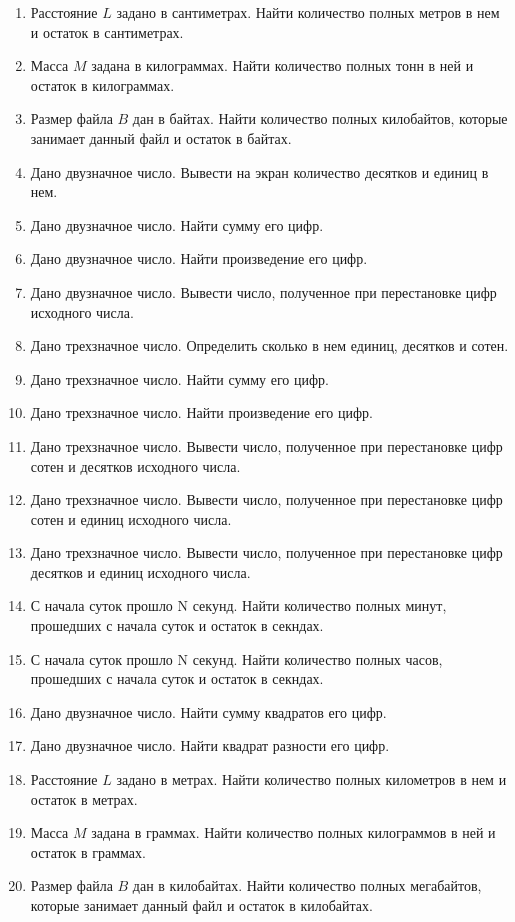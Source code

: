 \begin{enumerate}
\item Расстояние $L$ задано в сантиметрах. Найти количество полных метров в нем и остаток в
сантиметрах.
\item Масса $M$ задана в килограммах. Найти количество полных тонн в ней и остаток в килограммах.
\item Размер файла $B$ дан в байтах. Найти количество полных килобайтов, которые занимает данный файл
и остаток в байтах.
\item Дано двузначное число. Вывести на экран количество десятков и единиц в нем.
\item Дано двузначное число. Найти сумму его цифр.
\item Дано двузначное число. Найти произведение его цифр.
\item Дано двузначное число. Вывести число, полученное при перестановке цифр исходного числа.
\item Дано трехзначное число. Определить сколько в нем единиц, десятков и сотен.
\item Дано трехзначное число. Найти сумму его цифр.
\item Дано трехзначное число. Найти произведение его цифр.
\item Дано трехзначное число. Вывести число, полученное при перестановке цифр сотен и десятков исходного числа.
\item Дано трехзначное число. Вывести число, полученное при перестановке цифр сотен и единиц исходного числа.
\item Дано трехзначное число. Вывести число, полученное при перестановке цифр десятков и единиц исходного числа.
\item С начала суток прошло N секунд. Найти количество полных минут, прошедших с начала суток и остаток в секндах.
\item С начала суток прошло N секунд. Найти количество полных часов, прошедших с начала суток и остаток в секндах.
\item Дано двузначное число. Найти сумму квадратов его цифр.
\item Дано двузначное число. Найти квадрат разности его цифр.
\item Расстояние $L$ задано в метрах. Найти количество полных километров в нем и остаток в метрах.
\item Масса $M$ задана в граммах. Найти количество полных килограммов в ней и остаток в граммах.
\item Размер файла $B$ дан в килобайтах. Найти
количество полных мегабайтов, которые занимает данный файл и остаток в килобайтах.

\end{enumerate}
